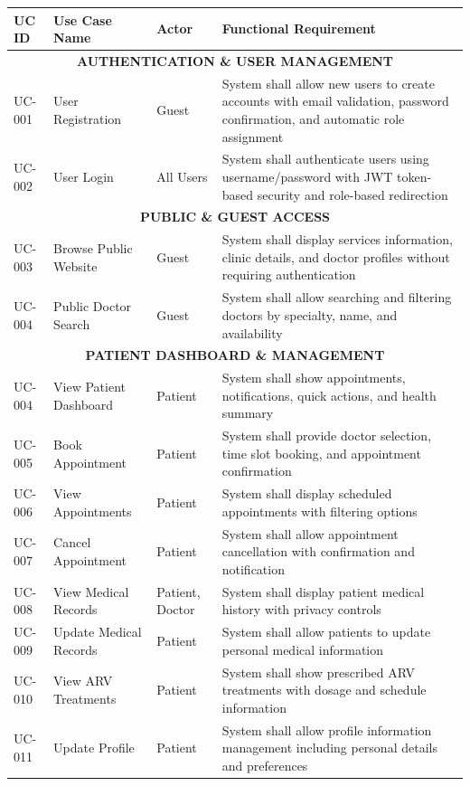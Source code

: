 \documentclass[12pt,a4paper]{article}
\begin{document}
\begin{longtable}{|p{1.2cm}|p{2.5cm}|p{3.5cm}|p{6.8cm}|}
\hline
\textbf{UC ID} & \textbf{Use Case Name} & \textbf{Actor} & \textbf{Functional Requirement} \\
\hline
\multicolumn{4}{|c|}{\textbf{AUTHENTICATION \& USER MANAGEMENT}} \\
\hline
UC-001 & User Registration & Guest & System shall allow new users to create accounts with email validation, password confirmation, and automatic role assignment \\
\hline
UC-002 & User Login & All Users & System shall authenticate users using username/password with JWT token-based security and role-based redirection \\
\hline
\multicolumn{4}{|c|}{\textbf{PUBLIC \& GUEST ACCESS}} \\
\hline
UC-003 & Browse Public Website & Guest & System shall display services information, clinic details, and doctor profiles without requiring authentication \\
\hline
UC-004 & Public Doctor Search & Guest & System shall allow searching and filtering doctors by specialty, name, and availability \\
\hline
\multicolumn{4}{|c|}{\textbf{PATIENT DASHBOARD \& MANAGEMENT}} \\
\hline
UC-004 & View Patient Dashboard & Patient & System shall show appointments, notifications, quick actions, and health summary \\
\hline
UC-005 & Book Appointment & Patient & System shall provide doctor selection, time slot booking, and appointment confirmation \\
\hline
UC-006 & View Appointments & Patient & System shall display scheduled appointments with filtering options \\
\hline
UC-007 & Cancel Appointment & Patient & System shall allow appointment cancellation with confirmation and notification \\
\hline
UC-008 & View Medical Records & Patient, Doctor & System shall display patient medical history with privacy controls \\
\hline
UC-009 & Update Medical Records & Patient & System shall allow patients to update personal medical information \\
\hline
UC-010 & View ARV Treatments & Patient & System shall show prescribed ARV treatments with dosage and schedule information \\
\hline
UC-011 & Update Profile & Patient & System shall allow profile information management including personal details and preferences \\

\end{longtable}
\end{document}
